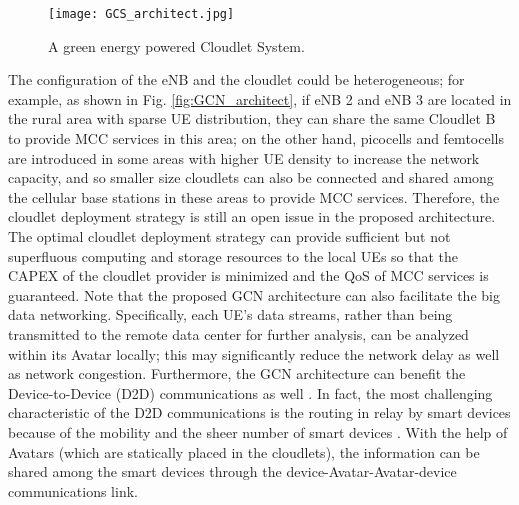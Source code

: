 \documentclass[journal,12pt,draftclsnofoot,onecolumn]{IEEEtran}
\begin{document}
\begin{figure}[!htb]
	\centering	
\texttt{[image: GCS\_architect.jpg]}
	\caption{A green energy powered Cloudlet System.}	
	\label{fig:GCS_achitect}
\end{figure}

The configuration of the eNB and the cloudlet could be heterogeneous; for example, as shown in Fig. \ref{fig:GCN_architect}, if eNB 2 and eNB 3 are located in the rural area with sparse UE distribution, they can share the same Cloudlet B to provide MCC services in this area; on the other hand, picocells and femtocells are introduced in some areas with higher UE density to increase the network capacity, and so smaller size cloudlets can also be connected and shared among the cellular base stations in these areas to provide MCC services. Therefore, the cloudlet deployment strategy is still an open issue in the proposed architecture. The optimal cloudlet deployment strategy can provide sufficient but not superfluous computing and storage resources to the local UEs so that the CAPEX of the cloudlet provider is minimized and the QoS of MCC services is guaranteed. Note that the proposed GCN architecture can also facilitate the big data networking. Specifically, each UE's data streams, rather than being transmitted to the remote data center for further analysis, can be analyzed within its Avatar locally; this may significantly reduce the network delay as well as network congestion. Furthermore, the GCN architecture can benefit the Device-to-Device (D2D) communications as well \cite{4.1}. In fact, the most challenging characteristic of the D2D communications is the routing in relay by smart devices because of the mobility and the sheer number of smart devices \cite{5}. With the help of Avatars (which are statically placed in the cloudlets), the information can be shared among the smart devices through the device-Avatar-Avatar-device communications link.   
\end{document}
